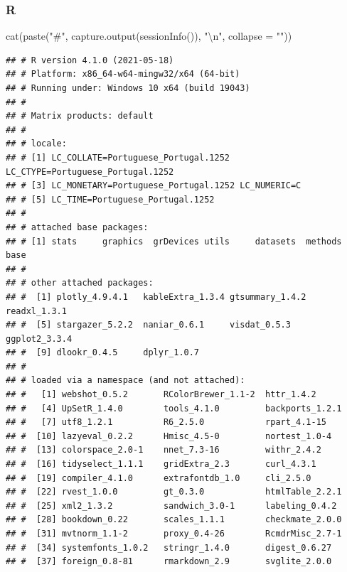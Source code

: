 \documentclass[
  12pt,
]{article}
\newenvironment{Shaded}{\begin{snugshade}}{\end{snugshade}}
\newcommand{\AttributeTok}[1]{\textcolor[rgb]{0.77,0.63,0.00}{#1}}
\newcommand{\FunctionTok}[1]{\textcolor[rgb]{0.00,0.00,0.00}{#1}}
\newcommand{\NormalTok}[1]{#1}
\newcommand{\SpecialCharTok}[1]{\textcolor[rgb]{0.00,0.00,0.00}{#1}}
\newcommand{\StringTok}[1]{\textcolor[rgb]{0.31,0.60,0.02}{#1}}
\begin{document}
\hypertarget{r-1}{%
\subsubsection{R}\label{r-1}}

\begin{Shaded}
\begin{Highlighting}[]
\FunctionTok{cat}\NormalTok{(}\FunctionTok{paste}\NormalTok{(}\StringTok{"\#"}\NormalTok{, }\FunctionTok{capture.output}\NormalTok{(}\FunctionTok{sessionInfo}\NormalTok{()), }\StringTok{"}\SpecialCharTok{\textbackslash{}n}\StringTok{"}\NormalTok{, }\AttributeTok{collapse  =} \StringTok{""}\NormalTok{))}
\end{Highlighting}
\end{Shaded}

\begin{verbatim}
## # R version 4.1.0 (2021-05-18) 
## # Platform: x86_64-w64-mingw32/x64 (64-bit) 
## # Running under: Windows 10 x64 (build 19043) 
## #  
## # Matrix products: default 
## #  
## # locale: 
## # [1] LC_COLLATE=Portuguese_Portugal.1252  LC_CTYPE=Portuguese_Portugal.1252    
## # [3] LC_MONETARY=Portuguese_Portugal.1252 LC_NUMERIC=C                         
## # [5] LC_TIME=Portuguese_Portugal.1252     
## #  
## # attached base packages: 
## # [1] stats     graphics  grDevices utils     datasets  methods   base      
## #  
## # other attached packages: 
## #  [1] plotly_4.9.4.1   kableExtra_1.3.4 gtsummary_1.4.2  readxl_1.3.1     
## #  [5] stargazer_5.2.2  naniar_0.6.1     visdat_0.5.3     ggplot2_3.3.4    
## #  [9] dlookr_0.4.5     dplyr_1.0.7      
## #  
## # loaded via a namespace (and not attached): 
## #   [1] webshot_0.5.2       RColorBrewer_1.1-2  httr_1.4.2          
## #   [4] UpSetR_1.4.0        tools_4.1.0         backports_1.2.1     
## #   [7] utf8_1.2.1          R6_2.5.0            rpart_4.1-15        
## #  [10] lazyeval_0.2.2      Hmisc_4.5-0         nortest_1.0-4       
## #  [13] colorspace_2.0-1    nnet_7.3-16         withr_2.4.2         
## #  [16] tidyselect_1.1.1    gridExtra_2.3       curl_4.3.1          
## #  [19] compiler_4.1.0      extrafontdb_1.0     cli_2.5.0           
## #  [22] rvest_1.0.0         gt_0.3.0            htmlTable_2.2.1     
## #  [25] xml2_1.3.2          sandwich_3.0-1      labeling_0.4.2      
## #  [28] bookdown_0.22       scales_1.1.1        checkmate_2.0.0     
## #  [31] mvtnorm_1.1-2       proxy_0.4-26        RcmdrMisc_2.7-1     
## #  [34] systemfonts_1.0.2   stringr_1.4.0       digest_0.6.27       
## #  [37] foreign_0.8-81      rmarkdown_2.9       svglite_2.0.0       

\end{verbatim}
\end{document}
